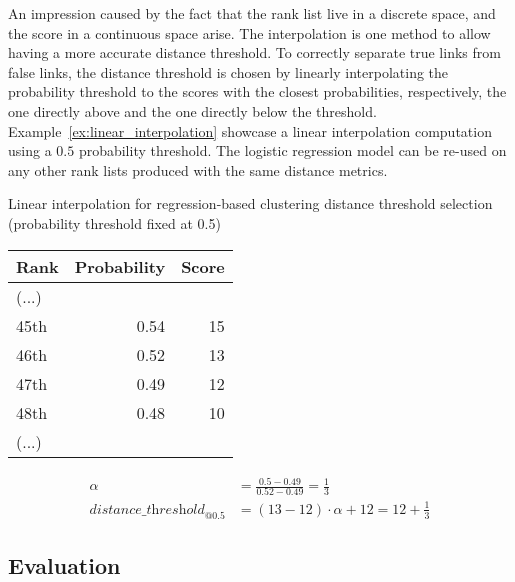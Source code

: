 An impression caused by the fact that the rank list live in a discrete space, and the score in a continuous space arise.
The interpolation is one method to allow having a more accurate distance threshold.
To correctly separate true links from false links, the distance threshold is chosen by linearly interpolating the probability threshold to the scores with the closest probabilities, respectively, the one directly above and the one directly below the threshold.
Example~\ref{ex:linear_interpolation} showcase a linear interpolation computation using a $0.5$ probability threshold.
The logistic regression model can be re-used on any other rank lists produced with the same distance metrics.

\begin{example}
  \centering
  \caption{Linear interpolation for regression-based clustering distance threshold selection (probability threshold fixed at 0.5)}
  \label{ex:linear_interpolation}

  \begin{subexample}{\linewidth}
    \centering
    \begin{tabular}{l r r}
      \toprule
      Rank & Probability & Score \\
      \midrule
      (...) & &\\
      45th & 0.54 & 15 \\
      46th & 0.52 & 13 \\
      47th & 0.49 & 12 \\
      48th & 0.48 & 10 \\
      (...) & & \\
      \bottomrule
    \end{tabular}
  \end{subexample}

  \vspace{0.5cm}

  \begin{subexample}{\linewidth}
    \centering
    \begin{align*}
        \alpha &= \frac{0.5 - 0.49}{0.52 - 0.49} = \frac{1}{3} \\
        \textit{distance\_threshold}_{@0.5} &= (13 - 12) \cdot \alpha + 12 = 12 + \frac{1}{3}
    \end{align*}
  \end{subexample}
\end{example}


\subsection{Evaluation}

